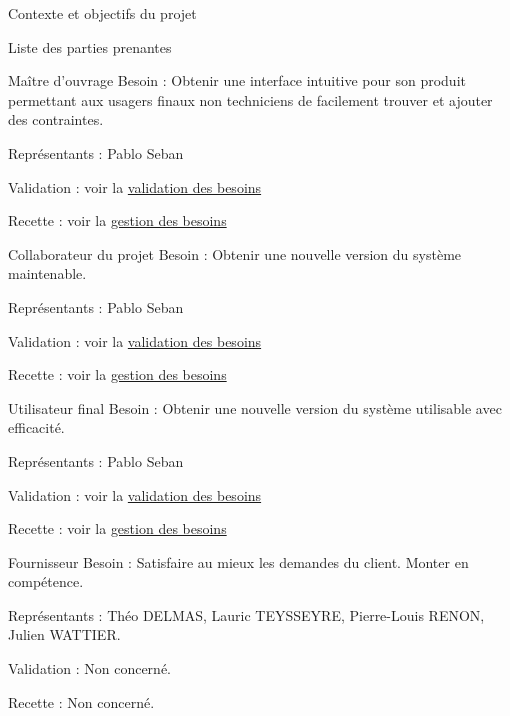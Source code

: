 \documentclass[]{article}
\begin{document}
{\begin{section}{\label{sec:Contexte et objectifs du projet}Contexte et objectifs du projet}
\begin{subsection}{\label{sec:Liste des parties prenantes}Liste des parties prenantes}
         \begin{subsubsection}{\label{sec:Maître d’ouvrage}Maître d’ouvrage}
             Besoin : Obtenir une interface intuitive pour son produit permettant aux usagers finaux non techniciens de facilement trouver et ajouter des contraintes.

             Représentants : Pablo Seban

             Validation : voir la \hyperref[sec:Validation des besoins]{validation des besoins}

             Recette : voir la \hyperref[sec:Gestion des besoins]{gestion des besoins}
         \end{subsubsection}

         \begin{subsubsection}{\label{sec:Collaborateur du projet}Collaborateur du projet}
             Besoin : Obtenir une nouvelle version du système maintenable.

             Représentants : Pablo Seban

             Validation : voir la \hyperref[sec:Validation des besoins]{validation des besoins}

             Recette : voir la \hyperref[sec:Gestion des besoins]{gestion des besoins}
         \end{subsubsection}

         \begin{subsubsection}{\label{sec:Utilisateur final}Utilisateur final}
             Besoin : Obtenir une nouvelle version du système utilisable avec efficacité.

             Représentants : Pablo Seban

             Validation : voir la \hyperref[sec:Validation des besoins]{validation des besoins}

             Recette : voir la \hyperref[sec:Gestion des besoins]{gestion des besoins}
         \end{subsubsection}

         \begin{subsubsection}{\label{sec:Fournisseur}Fournisseur}
             Besoin : Satisfaire au mieux les demandes du client.
             Monter en compétence.

             Représentants : Théo DELMAS, Lauric TEYSSEYRE, Pierre-Louis RENON, Julien WATTIER.


             Validation : Non concerné.

             Recette : Non concerné.
         \end{subsubsection}


\end{subsection}
\end{section}}
\end{document}
